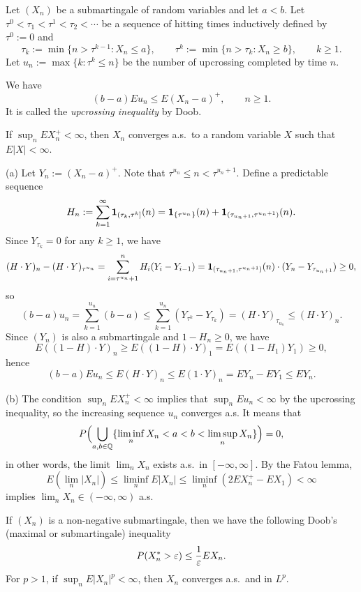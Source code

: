 \documentclass{../../large}
\begin{document}
\begin{prb}
Let $(X_n)$ be a submartingale of random variables and let $a<b$.
Let $\tau^0<\tau_1<\tau^1<\tau_2<\cdots$ be a sequence of hitting times inductively defined by $\tau^0:=0$ and
\[\tau_k:=\min\{n>\tau^{k-1}:X_n\le a\},\qquad\tau^k:=\min\{n>\tau_k:X_n\ge b\},\qquad k\ge1.\]
Let $u_n:=\max\{k:\tau^k\le n\}$ be the number of upcrossing completed by time $n$.
\begin{parts}
\item We have
\[(b-a)Eu_n\le E(X_n-a)^+,\qquad n\ge1.\]
It is called the \emph{upcrossing inequality} by Doob.
\item If $\sup_nEX_n^+<\infty$, then $X_n$ converges a.s.~to a random variable $X$ such that $E|X|<\infty$.
\end{parts}
\end{prb}
\begin{pf}
(a)
Let $Y_n:=(X_n-a)^+$.
Note that $\tau^{u_n}\le n<\tau^{u_n+1}$.
Define a predictable sequence
\[H_n:=\sum_{k=1}^\infty\mathbf{1}_{(\tau_k,\tau^k]}(n)=\mathbf{1}_{\{\tau^{u_n}\}}(n)+\mathbf{1}_{(\tau_{u_n+1},\tau^{u_n+1})}(n).\]
Since $Y_{\tau_k}=0$ for any $k\ge1$, we have
\[(H\cdot Y)_n-(H\cdot Y)_{\tau^{u_n}}=\sum_{i=\tau^{u_n}+1}^nH_i(Y_i-Y_{i-1})=\mathbf{1}_{(\tau_{u_n+1},\tau^{u_n+1})}(n)\cdot(Y_n-Y_{\tau_{u_n+1}})\ge0,\]
so
\[(b-a)u_n=\sum_{k=1}^{u_n}(b-a)\le\sum_{k=1}^{u_n}(Y_{\tau^k}-Y_{\tau_k})=(H\cdot Y)_{\tau_{u_n}}\le(H\cdot Y)_n.\]
Since $(Y_n)$ is also a submartingale and $1-H_n\ge0$, we have
\[E((1-H)\cdot Y)_n\ge E((1-H)\cdot Y)_1=E((1-H_1)Y_1)\ge0,\]
hence
\[(b-a)Eu_n\le E(H\cdot Y)_n\le E(1\cdot Y)_n=EY_n-EY_1\le EY_n.\]

(b)
The condition $\sup_nEX_n^+<\infty$ implies that $\sup_nEu_n<\infty$ by the upcrossing inequality, so the increasing sequence $u_n$ converges a.s.
It means that
\[P\Bigl(\bigcup_{a,b\in\mathbb{Q}}\{\liminf_nX_n<a<b<\limsup_nX_n\}\Bigr)=0,\]
in other words, the limit $\lim_nX_n$ exists a.s.~in $[-\infty,\infty]$.
By the Fatou lemma,
\[E(\lim_n|X_n|)\le\liminf_nE|X_n|\le\liminf_n(2EX_n^+-EX_1)<\infty\]
implies $\lim_nX_n\in(-\infty,\infty)$ a.s.
\end{pf}



\begin{prb}
If $(X_n)$ is a non-negative submartingale, then we have the following Doob's (maximal or submartingale) inequality
\[P(X^*_n>\varepsilon)\le\frac1{\varepsilon} EX_n.\]
For $p>1$, if $\sup_nE|X_n|^p<\infty$, then $X_n$ converges a.s.~and in $L^p$.
\end{prb}
\end{document}
